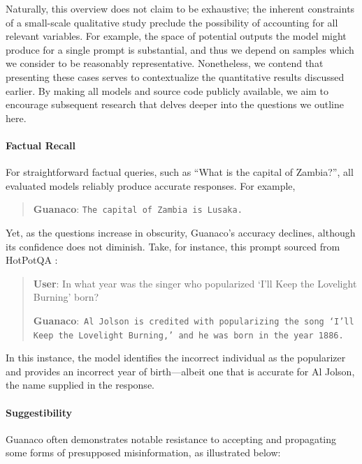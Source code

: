Naturally, this overview does not claim to be exhaustive; the inherent constraints of a small-scale qualitative study preclude the possibility of accounting for all relevant variables. For example, the space of potential outputs the model might produce for a single prompt is substantial, and thus we depend on samples which we consider to be reasonably representative. Nonetheless, we contend that presenting these cases serves to contextualize the quantitative results discussed earlier. By making all models and source code publicly available, we aim to encourage subsequent research that delves deeper into the questions we outline here.
\paragraph{Factual Recall} For straightforward factual queries, such as ``What is the capital of Zambia?'', all evaluated models reliably produce accurate responses. For example,

\begin{quote} 
    \textbf{Guanaco}:
    \texttt{The capital of Zambia is Lusaka.}
\end{quote}

 Yet, as the questions increase in obscurity, {Guanaco}'s accuracy declines, although its confidence does not diminish. Take, for instance, this prompt sourced from HotPotQA \citep{yang2018hotpotqa}:

\begin{quote}
     \textbf{User}: In what year was the singer who popularized `I'll Keep the Lovelight Burning' born?  

     \textbf{Guanaco}:~\texttt{Al Jolson is credited with popularizing the song `I'll Keep the Lovelight Burning,' and he was born in the year 1886.}
 \end{quote}

 In this instance, the model identifies the incorrect individual as the popularizer and provides an incorrect year of birth—albeit one that is accurate for Al Jolson, the name supplied in the response.

\paragraph{Suggestibility} {Guanaco} often demonstrates notable resistance to accepting and propagating some forms of presupposed misinformation, as illustrated below:

